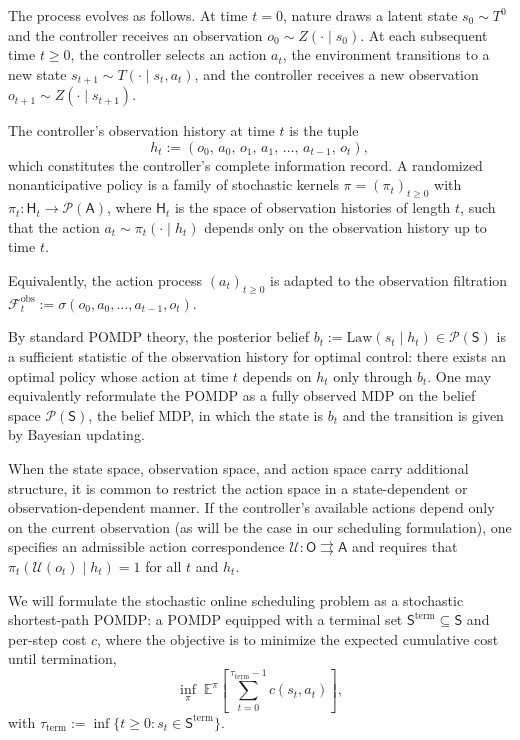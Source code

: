 The process evolves as follows. At time $t = 0$, nature draws a latent state
$s_0 \sim T^0$ and the controller receives an observation $o_0 \sim Z(\cdot \mid s_0)$.
At each subsequent time $t \ge 0$, the controller selects an action $a_t$, the environment
transitions to a new state $s_{t+1} \sim T(\cdot \mid s_t, a_t)$, and the controller receives
a new observation $o_{t+1} \sim Z(\cdot \mid s_{t+1})$.

The controller's observation history at time $t$ is the tuple
\[
h_t := (o_0,\, a_0,\, o_1,\, a_1,\, \ldots,\, a_{t-1},\, o_t),
\]
which constitutes the controller's complete information record. A randomized nonanticipative policy is a family of stochastic kernels
$\pi = (\pi_t)_{t \ge 0}$ with $\pi_t : \mathsf{H}_t \to \mathcal{P}(\mathsf{A})$, where $\mathsf{H}_t$ is the space of observation histories of length $t$, such that the action $a_t \sim \pi_t(\cdot \mid h_t)$ depends only on the observation history up to time $t$. 

Equivalently, the action process $(a_t)_{t \ge 0}$ is adapted to the observation filtration $\mathcal{F}_t^{\mathrm{obs}} := \sigma(o_0, a_0, \ldots, a_{t-1}, o_t)$.

\begin{remark}
By standard POMDP theory, the posterior belief
$b_t := \mathrm{Law}(s_t \mid h_t) \in \mathcal{P}(\mathsf{S})$ is a sufficient statistic of
the observation history for optimal control: there exists an optimal policy whose action
at time $t$ depends on $h_t$ only through $b_t$. One may equivalently reformulate the
POMDP as a fully observed MDP on the belief space $\mathcal{P}(\mathsf{S})$, the belief MDP, in which the state is $b_t$ and the transition is given by Bayesian updating.
\end{remark}

When the state space, observation space, and action space carry additional structure, it is common to restrict the action space in a state-dependent or observation-dependent manner. If the controller's available actions depend only on the current observation (as will be the case in our scheduling formulation), one specifies an admissible
action correspondence $\mathcal{U} : \mathsf{O} \rightrightarrows \mathsf{A}$ and requires that $\pi_t(\mathcal{U}(o_t) \mid h_t) = 1$ for all $t$ and $h_t$.

We will formulate the stochastic online scheduling problem as a stochastic shortest-path POMDP: a POMDP equipped with a terminal set
$\mathsf{S}^{\mathrm{term}} \subseteq \mathsf{S}$ and per-step cost $c$, where the objective is to minimize the expected cumulative cost until termination,
\[
\inf_{\pi} \; \mathbb{E}^{\pi}\!\left[\sum_{t=0}^{\tau_{\mathrm{term}}-1}
c(s_t, a_t)\right],
\]
with $\tau_{\mathrm{term}} := \inf\{t \ge 0 : s_t \in \mathsf{S}^{\mathrm{term}}\}$.

